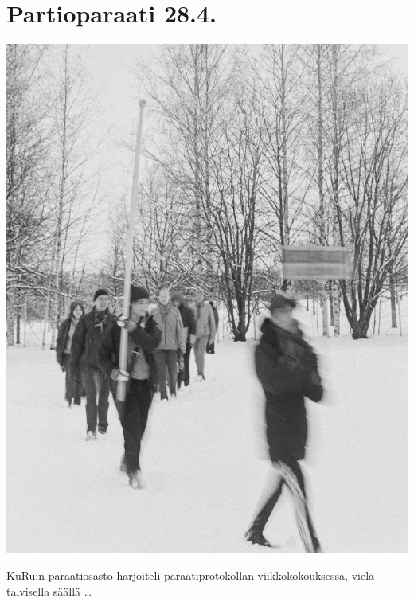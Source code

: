 
\section{Partioparaati 28.4.}

\vspace*{-0.64cm}
\begin{multicols}{2}

	\begin{center}
		\noindent\includegraphics[width=0.85\linewidth]{assets/paraati1}
	\end{center}

	\vspace*{-0.32cm}
	\small KuRu:n paraatiosasto harjoiteli \mbox{paraati}protokollan
	viikkokokouksessa, vielä talvisella säällä \ldots

	\columnbreak


\end{multicols}
